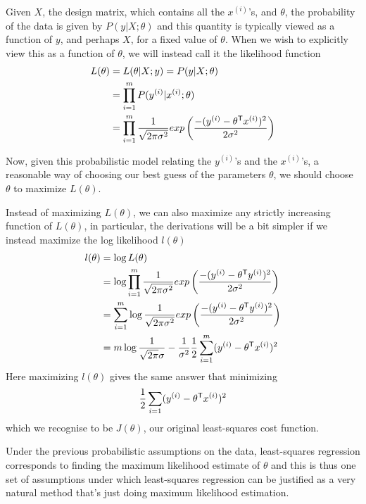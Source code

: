 Given $X$, the design matrix, which contains all the $x^{(i)}$’s, and $\theta$, 
the probability of the data is given by $P(y| X; \theta)$ and this quantity is typically viewed 
as a function of $y$, and perhaps $X$, for a fixed value of $\theta$.\newline
When we wish to explicitly view this as a function of $\theta$, we will instead call it the likelihood function
\begin{align*}
    L(\theta) & = L(\theta | X; y) = P(y | X; \theta) \\
              & = \prod _{i = 1} ^ m P(y^{(i)} | x^{(i)}; \theta) \\
              & = \prod _{i = 1} ^ m \frac{1}{\sqrt{2 \pi \sigma ^ 2}} exp \left(\frac{-(y^{(i)} - \theta ^ \mathsf{T}x^{(i)})^2}{2 \sigma ^ 2}\right) \\
\end{align*}

Now, given this probabilistic model relating the $y^{(i)}$’s and the $x^{(i)}$’s, a reasonable way
of choosing our best guess of the parameters $\theta$, we should choose $\theta$ to maximize $L(\theta)$.

Instead of maximizing $L(\theta)$, we can also maximize any strictly increasing function of $L(\theta)$, 
in particular, the derivations will be a bit simpler if we  instead maximize the log likelihood $l(\theta)$
\begin{align*}
    l(\theta) & = \log L(\theta) \\
              & = \log \prod _{i=1} ^ m \frac{1}{\sqrt{2 \pi \sigma ^ 2}} exp \left(\frac{-(y^{(i)} - \theta ^ \mathsf{T}y^{(i)})^2}{2 \sigma ^ 2}\right) \\
              & = \sum _{i = 1} ^ m \log \frac{1}{\sqrt{2 \pi \sigma^2}} exp \left(\frac{-(y^{(i)} - \theta ^ \mathsf{T}y^{(i)})^2}{2 \sigma^2}\right) \\
              & = m \log \frac{1}{\sqrt{2 \pi} \sigma} - 
                  \frac{1}{\sigma^2} \frac{1}{2} \sum _{i=1}^m (y^{(i)} - \theta ^ \mathsf{T}x^{(i)})^2 \\
\end{align*}
Here maximizing $l(\theta)$ gives the same answer that minimizing
\[ \frac{1}{2} \sum _{i = 1} (y^{(i)} - \theta ^ \mathsf{T}x^{(i)})^2 \]
which we recognise to be $J(\theta)$, our original least-squares cost function.

Under the previous probabilistic assumptions on the data, least-squares regression corresponds
to finding the maximum likelihood estimate of $\theta$ and this is thus one set of assumptions 
under which least-squares regression can be justified as a very natural method that’s just 
doing maximum likelihood estimation.

